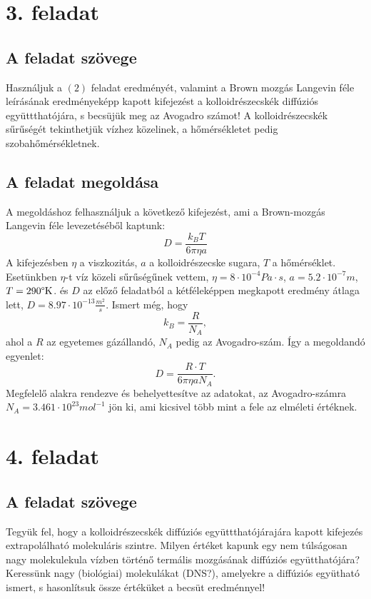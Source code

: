 \documentclass[12pt]{article}
\begin{document}
\section*{3. feladat} 
\subsection*{ A feladat szövege}
Használjuk a $(2)$ feladat eredményét, valamint a Brown mozgás Langevin féle leírásának eredményeképp
kapott kifejezést a kolloidrészecskék diffúziós együttthatójára, s becsüjük meg az Avogadro számot! A kolloidrészecskék sűrűségét tekinthetjük vízhez közelinek, a hőmérsékletet pedig szobahőmérsékletnek.

 
 \subsection*{A feladat megoldása}
 A megoldáshoz felhasználjuk a következő kifejezést, ami a Brown-mozgás Langevin féle levezetéséből kaptunk:
$$D = \frac{k_B T}{6\pi\eta a}$$
A kifejezésben $\eta$ a viszkozitás, $a$ a kolloidrészecske sugara, $T$ a hőmérséklet. Esetünkben $\eta$-t víz közeli sűrűségűnek vettem, $\eta = 8\cdot 10^{-4} Pa\cdot s$, $a = 5.2\cdot 10^{-7} m$, $T = 290 \text{\textdegree{K}}$. és $D$ az előző feladatból a kétféleképpen megkapott eredmény átlaga lett, $D = 8.97\cdot 10^{-13}\frac{m^2}{s}$. Ismert még, hogy $$k_B= \frac{R}{N_A},$$ ahol a $R$ az egyetemes gázállandó, $N_A$ pedig az Avogadro-szám. Így a megoldandó egyenlet:
$$ D = \frac{R\cdot T}{6\pi \eta a N_A} .$$
Megfelelő alakra rendezve és behelyettesítve az adatokat\cite{wik}, az Avogadro-számra $N_A = 3.461\cdot 10^{23} mol^{-1}$ jön ki, ami kicsivel több mint a fele az elméleti értéknek. 



\newpage
\section*{4. feladat}
\subsection*{ A feladat szövege}
Tegyük fel, hogy a kolloidrészecskék diffúziós együttthatójárajára kapott kifejezés extrapolálható molekuláris
szintre. Milyen értéket kapunk egy nem túlságosan nagy molekulekula vízben történő termális mozgásának diffúziós együtthatójára? Keressünk nagy (biológiai) molekulákat (DNS?), amelyekre a diffúziós együtható ismert, s hasonlítsuk össze értéküket a becsüt eredménnyel!
\end{document}
